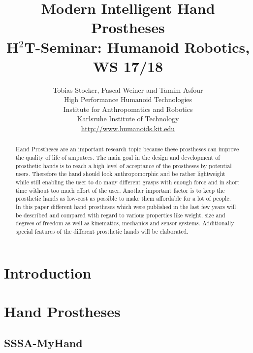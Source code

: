 \documentclass[a4paper, 10pt, conference]{ieeeconf}      %
\title{\bf {\LARGE Modern Intelligent Hand Prostheses} \\ 
{\normalsize H$^2$T-Seminar: Humanoid Robotics, WS 17/18}}
\author{Tobias Stocker, Pascal Weiner and Tamim Asfour \\ High Performance Humanoid Technologies \\ Institute for Anthropomatics and Robotics \\ Karlsruhe Institute of Technology \\
\url{http://www.humanoids.kit.edu}}
\begin{document}
\maketitle
\thispagestyle{empty}
\pagestyle{empty}
%
\begin{abstract}
Hand Prostheses are an important research topic because these prostheses can improve the quality of life of amputees. The main goal in the design and development of prosthetic hands is to reach a high level of acceptance of the prostheses by potential users. Therefore the hand should look anthropomorphic and be rather lightweight while still enabling the user to do many different grasps with enough force and in short time without too much effort of the user. Another important factor is to keep the prosthetic hands as low-cost as possible to make them affordable for a lot of people.\\
In this paper different hand prostheses which were published in the last few years will be described and compared with regard to various properties like weight, size and degrees of freedom as well as kinematics, mechanics and sensor systems. Additionally special features of the different prosthetic hands will be elaborated.
\end{abstract}

\section{Introduction}

\section{Hand Prostheses}

\subsection{SSSA-MyHand}
\end{document}
